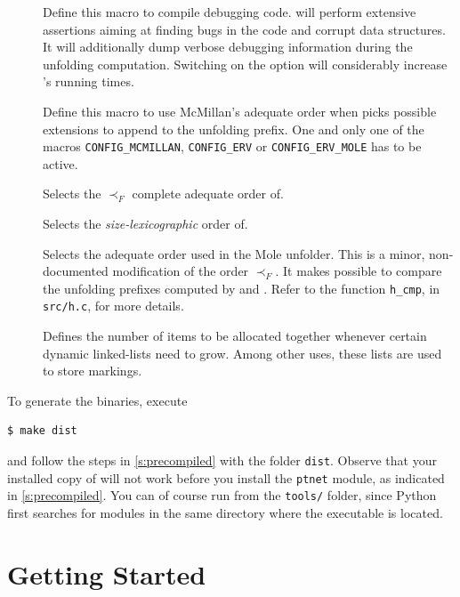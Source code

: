 \documentclass[a4paper]{refart}
\begin{document}
\begin{description}
\item[]  Define this macro to compile debugging code.
\cunf will perform extensive assertions aiming at finding bugs in the code and
corrupt data structures.  It will additionally dump verbose debugging
information during the unfolding computation.  Switching on the option will
considerably increase \cunf's running times.

\item[]  Define this macro to use McMillan's adequate
order\cite{MM95} when \cunf picks possible extensions to append to the
unfolding prefix.  One and only one of the macros \verb!CONFIG_MCMILLAN!,
\verb!CONFIG_ERV! or \verb!CONFIG_ERV_MOLE! has to be active.

\item[]  Selects the $\prec_F$ complete adequate order
of\cite{ERV02}.

\item[]  Selects the \emph{size-lexicographic} order
of\cite[definition 4.51]{EH08}.

\item[]  Selects the adequate order used in the Mole
unfolder\cite{Mole}.  This is a minor, non-documented modification of
the order $\prec_F$.  It makes possible to compare the unfolding prefixes
computed by \cunf and \mole.  Refer to the function \verb!h_cmp!, in
\verb!src/h.c!, for more details.

\item[]  Defines the number of items to be
allocated together whenever certain dynamic linked-lists need to grow.  Among
other uses, these lists are used to store markings.

\end{description}

To generate the binaries, execute
\begin{verbatim}
$ make dist
\end{verbatim}
and follow the steps in \cref{s:precompiled} with the folder \verb!dist!.
Observe that your installed copy of \cna will not work before you install the
\verb!ptnet! module, as indicated in \cref{s:precompiled}.
You can of course run \cna from the \verb!tools/! folder, since Python first
searches for modules in the same directory where the executable is located.

\section{Getting Started}%
\label{s:getting}
\end{document}
